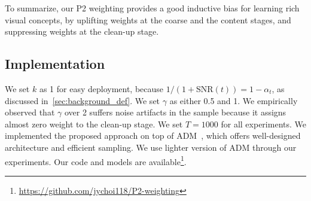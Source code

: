 
To summarize, our P2 weighting provides a good inductive bias for learning rich visual concepts, by uplifting weights at the coarse and the content stages, and suppressing weights at the clean-up stage.



\subsection{Implementation}
We set $k$ as 1 for easy deployment, because $1/(1+\text{SNR}(t))=1-\alpha_t$, as discussed in~\cref{sec:background_def}. We set $\gamma$ as either 0.5 and 1. We empirically observed that $\gamma$ over 2 suffers noise artifacts in the sample because it assigns almost zero weight to the clean-up stage. We set $T=1000$ for all experiments. We implemented the proposed approach on top of ADM~\cite{dhariwal2021diffusion}, which offers well-designed architecture and efficient sampling. We use lighter version of ADM through our experiments. Our code and models are available\footnote{\url{https://github.com/jychoi118/P2-weighting}}.

